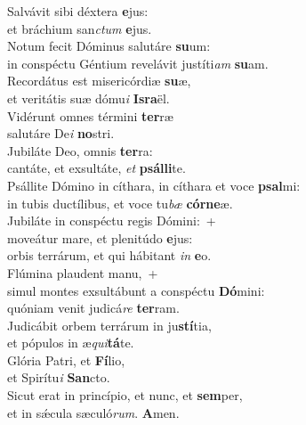 \evenverse Salvávit sibi déxtera \textbf{e}jus:~\*\\
\evenverse et bráchium san\textit{ctum} \textbf{e}jus.\\
\oddverse Notum fecit Dóminus salutáre \textbf{su}um:~\*\\
\oddverse in conspéctu Géntium revelávit justíti\textit{am} \textbf{su}am.\\
\evenverse Recordátus est misericórdiæ \textbf{su}æ,~\*\\
\evenverse et veritátis suæ dómu\textit{i} \textbf{Is}\textbf{ra}ël.\\
\oddverse Vidérunt omnes términi \textbf{ter}ræ~\*\\
\oddverse salutáre De\textit{i} \textbf{no}stri.\\
\evenverse Jubiláte Deo, omnis \textbf{ter}ra:~\*\\
\evenverse cantáte, et exsultáte, \textit{et} \textbf{psál}\textbf{li}te.\\
\oddverse Psállite Dómino in cíthara, in cíthara et voce \textbf{psal}mi:~\*\\
\oddverse in tubis ductílibus, et voce tu\textit{bæ} \textbf{cór}\textbf{ne}æ.\\
\evenverse Jubiláte in conspéctu regis Dómini:~+\\
\evenverse  moveátur mare, et plenitúdo \textbf{e}jus:~\*\\
\evenverse orbis terrárum, et qui hábitant \textit{in} \textbf{e}o.\\
\oddverse Flúmina plaudent manu,~+\\
\oddverse  simul montes exsultábunt a conspéctu \textbf{Dó}mini:~\*\\
\oddverse quóniam venit judicá\textit{re} \textbf{ter}ram.\\
\evenverse Judicábit orbem terrárum in ju\textbf{stí}tia,~\*\\
\evenverse et pópulos in æ\textit{qui}\textbf{tá}te.\\
\oddverse Glória Patri, et \textbf{Fí}lio,~\*\\
\oddverse et Spirítu\textit{i} \textbf{San}cto.\\
\evenverse Sicut erat in princípio, et nunc, et \textbf{sem}per,~\*\\
\evenverse et in sǽcula sæculó\textit{rum}. \textbf{A}men.\\

